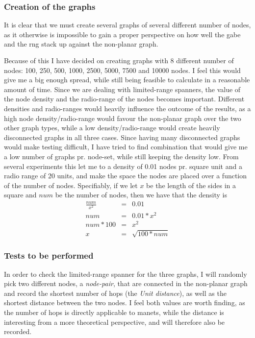 \subsubsection{Creation of the graphs}
It is clear that we must create several graphs of several different number of nodes, as it otherwise is impossible to gain a proper perspective on how well the \ac{gabe} and the \ac{rng} stack up against the non-planar graph.

Because of this I have decided on creating graphs with 8 different number of nodes: 100, 250, 500, 1000, 2500, 5000, 7500 and 10000 nodes. I feel this would give me a big enough spread, while still being feasible to calculate in a reasonable amount of time. Since we are dealing with limited-range spanners, the value of the node density and the radio-range of the nodes becomes important. Different densities and radio-ranges would heavily influence the outcome of the results, as a high node density/radio-range would favour the non-planar graph over the two other graph types, while a low density/radio-range would create heavily disconnected graphs in all three cases. Since having many disconnected graphs would make testing difficult, I have tried to find combination that would give me a low number of graphs pr. node-set, while still keeping the density low. From several experiments this let me to a density of 0.01 nodes pr. square unit and a radio range of 20 units, and make the space the nodes are placed over a function of the number of nodes. Specifiably, if we let $x$ be the length of the sides in a square and $num$ be the number of nodes, then we have that the density is
\begin{eqnarray}
\frac{num}{x^2} &=& 0.01 \\
num &=& 0.01 * x^2 \\
num * 100 &=& x^2 \\
x &=& \sqrt{100 * num}  
\end{eqnarray}

\subsubsection{Tests to be performed}
In order to check the limited-range spanner for the three graphs, I will randomly pick two different nodes, a \emph{node-pair}, that are connected in the non-planar graph and record the shortest number of hops (the \emph{Unit distance}), as well as the shortest distance between the two nodes. I feel both values are worth finding, as the number of hops is directly applicable to \acp{manet}, while the distance is interesting from a more theoretical perspective, and will therefore also be recorded. 

